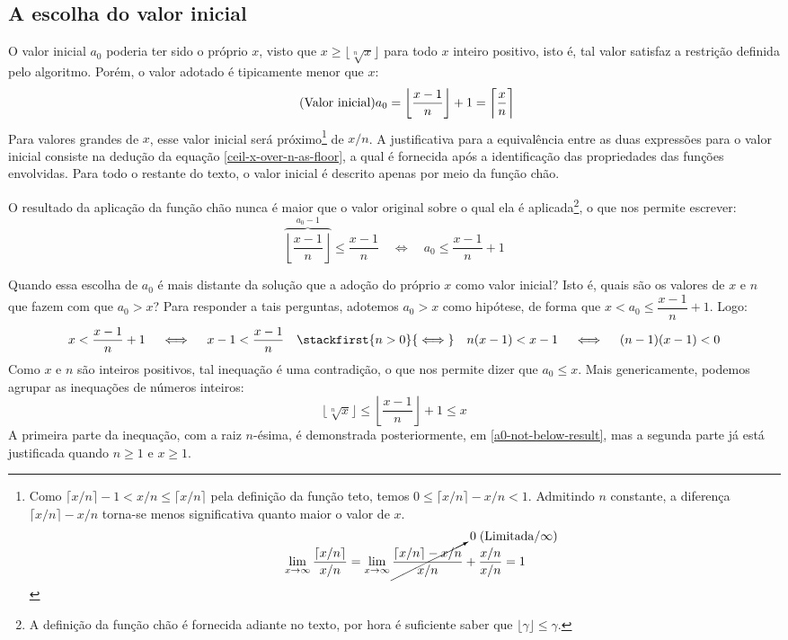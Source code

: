 \subsection*{A escolha do valor inicial}

O valor inicial $a_0$ poderia ter sido o próprio $x$,
visto que $x \ge \lfloor \sqrt[n]{x} \rfloor$
para todo $x$ inteiro positivo,
isto é, tal valor satisfaz a restrição definida pelo algoritmo.
Porém, o valor adotado é tipicamente menor que $x$:
\[\tag{Valor inicial}
  a_0 = \left\lfloor \dfrac{x - 1}{n} \right\rfloor + 1
      = \left\lceil \dfrac{x\vphantom{l}}{n} \right\rceil
\]
Para valores grandes de $x$, esse valor inicial será próximo\footnote{
  Como $\lceil x/n \rceil - 1 < x/n \le \lceil x/n \rceil$
  pela definição da função teto,
  temos $0 \le \lceil x/n \rceil - x/n < 1$.
  Admitindo $n$ constante, a diferença $\lceil x/n \rceil - x/n$
  torna-se menos significativa quanto maior o valor de $x$.
  \[
    \lim_{x\to\infty} \dfrac{\lceil x/n \rceil}{x/n}
    =
    \lim_{x\to\infty} \cancelto{0\;(\text{Limitada}/\infty)}{
                        \dfrac{\lceil x/n \rceil - x/n}{x/n}
                      } +
                      \dfrac{x/n}{x/n}
    = 1
  \]
}
de $x/n$.
A justificativa para a equivalência
entre as duas expressões para o valor inicial
consiste na dedução da equação \eqref{ceil-x-over-n-as-floor}, a qual
é fornecida após a identificação das propriedades
das funções envolvidas.
Para todo o restante do texto,
o valor inicial é descrito apenas por meio da função chão.

O resultado da aplicação da função chão
nunca é maior que o valor original
sobre o qual ela é aplicada\footnote{
  A definição da função chão é fornecida adiante no texto,
  por hora é suficiente saber que $\lfloor \gamma \rfloor \le \gamma$.
},
o que nos permite escrever:
\[
  \overbrace{\left\lfloor \dfrac{x - 1}{n} \right\rfloor}^{a_0 - 1}
  \le \dfrac{x - 1}{n}
  \quad\iff\quad
  a_0 \le \dfrac{x - 1}{n} + 1
\]

Quando essa escolha de $a_0$
é mais distante da solução
que a adoção do próprio $x$ como valor inicial?
Isto é, quais são os valores de $x$ e $n$
que fazem com que $a_0 > x$?
Para responder a tais perguntas,
adotemos $a_0 > x$ como hipótese,
de forma que $x < a_0 \le \dfrac{x - 1}{n} + 1$.
Logo:
\[
  x < \dfrac{x - 1}{n} + 1
  \quad\iff\quad
  x - 1 < \dfrac{x - 1}{n}
  \quad\stackfirst{n > 0}{\iff}\quad
  n(x - 1) < x - 1
  \quad\iff\quad
  (n - 1)(x - 1) < 0
\]
Como $x$ e $n$ são inteiros positivos,
tal inequação é uma contradição,
o que nos permite dizer que $a_0 \le x$.
Mais genericamente,
podemos agrupar as inequações de números inteiros:
\begin{equation}\label{a0-between-result-and-x}
  \lfloor \sqrt[n]{x} \rfloor
  \le
  \left\lfloor \dfrac{x - 1}{n} \right\rfloor + 1
  \le
  x
\end{equation}
A primeira parte da inequação, com a raiz $n$-ésima,
é demonstrada posteriormente, em \eqref{a0-not-below-result},
mas a segunda parte já está justificada quando $n \ge 1$ e $x \ge 1$.
